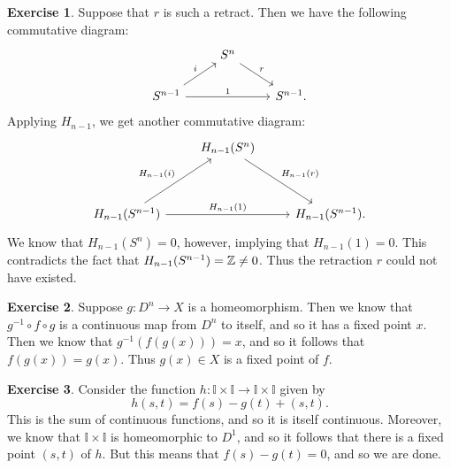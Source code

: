 \documentclass[10pt]{article}
\theoremstyle{definition}
\newtheorem{intex}{Exercise}[section]
\newenvironment{exercise}{\begin{intex}\label{\theintex}}{\end{intex}}
\newcommand*\II{\mathbb I}
\begin{document}
\begin{exercise} \leavevmode
Suppose that $r$ is such a retract. Then we have the following commutative diagram: 
\[\begin{tikzcd}
&S^n\arrow[rd,"r"]&\\
S^{n-1}\arrow[ru,"i"]\arrow[rr,"1"]&&S^{n-1}. 
\end{tikzcd}\] 
Applying $H_{n-1}$, we get another commutative diagram: 
\[\begin{tikzcd}[row sep=huge] 
&H_{n-1}(S^n)\arrow[rd,"H_{n-1}(r)"]&\\
H_{n-1}(S^{n-1})\arrow[ru,"H_{n-1}(i)"]\arrow[rr,"H_{n-1}(1)"]&&H_{n-1}(S^{n-1}).
\end{tikzcd}\]
We know that $H_{n-1}(S^n)=0$, however, implying that $H_{n-1}(1)=0$. This contradicts the fact that $H_{n-1}(S^{n-1})=\mathbb{Z}\ne0$. Thus the retraction $r$ could not have existed. 
\end{exercise} 

\begin{exercise} \leavevmode
Suppose $g:D^n\to X$ is a homeomorphism. Then we know that $g^{-1}\circ f\circ g$ is a continuous map from $D^n$ to itself, and so it has a fixed point $x$. Then we know that $g^{-1}(f(g(x)))=x$, and so it follows that $f(g(x))=g(x)$. Thus $g(x)\in X$ is a fixed point of $f$. 
\end{exercise} 

\begin{exercise} \leavevmode
Consider the function $h:\II\times\II\to\II\times\II$ given by \[h(s,t)=f(s)-g(t)+(s,t).\] This is the sum of continuous functions, and so it is itself continuous. Moreover, we know that $\II\times\II$ is homeomorphic to $D^1$, and so it follows that there is a fixed point $(s,t)$ of $h$. But this means that $f(s)-g(t)=0$, and so we are done. 
\end{exercise} 
\end{document}
